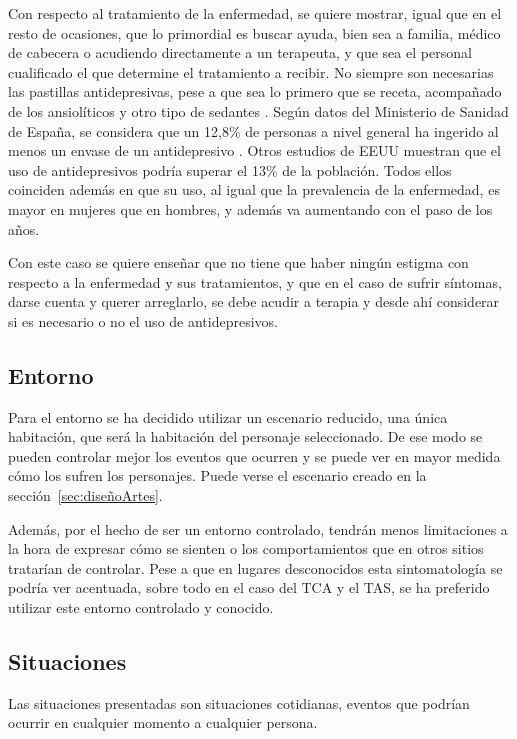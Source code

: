 \documentclass[12pt, a4paper,twoside,titlepage]{book}
\begin{document}
\begin{itemize}
{Con respecto al tratamiento de la enfermedad, se quiere mostrar, igual que en el resto de ocasiones, que lo primordial es buscar ayuda, bien sea a familia, médico de cabecera o acudiendo directamente a un terapeuta, y que sea el personal cualificado el que determine el tratamiento a recibir. No siempre son necesarias las pastillas antidepresivas, pese a que sea lo primero que se receta, acompañado de los ansiolíticos y otro tipo de sedantes \cite{articuloDEP7}. Según datos del Ministerio de Sanidad de España, se considera que un 12,8\% de personas a nivel general ha ingerido al menos un envase de un antidepresivo \cite{articuloDEP8}.  Otros estudios de EEUU muestran que el uso de antidepresivos podría superar el 13\% de la población. Todos ellos coinciden además en que su uso, al igual que la prevalencia de la enfermedad, es mayor en mujeres que en hombres, y además va aumentando con el paso de los años. 

Con este caso se quiere enseñar que no tiene que haber ningún estigma con respecto a la enfermedad y sus tratamientos, y que en el caso de sufrir síntomas, darse cuenta y querer arreglarlo, se debe acudir a terapia y desde ahí considerar si es necesario o no el uso de antidepresivos. 
}
     
\end{itemize}




\subsection{Entorno}
Para el entorno se ha decidido utilizar un escenario reducido, una única habitación, que será la habitación del personaje seleccionado. De ese modo se pueden controlar mejor los eventos que ocurren y se puede ver en mayor medida cómo los sufren los personajes. Puede verse el escenario creado en la sección~\ref{sec:diseñoArtes}. 

Además, por el hecho de ser un entorno controlado, tendrán menos limitaciones a la hora de expresar cómo se sienten o los comportamientos que en otros sitios tratarían de controlar. Pese a que en lugares desconocidos esta sintomatología se podría ver acentuada, sobre todo en el caso del TCA y el TAS, se ha preferido utilizar este entorno controlado y conocido.  

\subsection{Situaciones}
Las situaciones presentadas son situaciones cotidianas, eventos que podrían ocurrir en cualquier momento a cualquier persona. 
\end{document}
